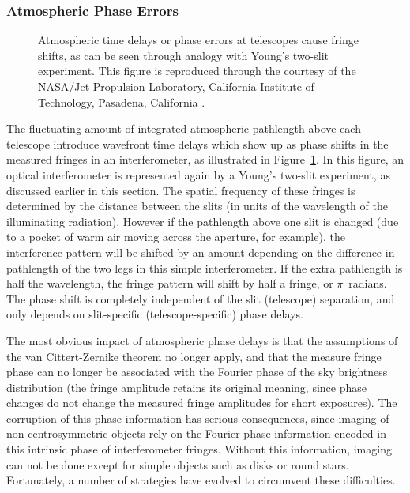 \documentclass[12pt]{iopart}
\begin{document}
\subsubsection{Atmospheric Phase Errors}
\begin{figure}
\begin{center}
\centerline{}
\caption{Atmospheric time delays or phase errors at telescopes 
cause fringe shifts, as can be seen through analogy with Young's
two-slit experiment. This figure is reproduced through the courtesy
of the NASA/Jet Propulsion Laboratory, 
California Institute of Technology, Pasadena, California \citep{monnier_mss}.
\label{monnier_fig_1}}
\end{center}
\end{figure}

The fluctuating amount of integrated atmospheric pathlength above each
telescope introduce wavefront time delays which show up as phase
shifts in the measured fringes in an interferometer, as illustrated in
Figure~\ref{monnier_fig_1}.  In this figure, an optical interferometer
is represented again by a Young's two-slit experiment, as discussed
earlier in this section.  The spatial frequency of these
fringes is determined by the distance between the slits (in units of
the wavelength of the illuminating radiation).  However if the
pathlength above one slit is changed (due to a pocket of warm air
moving across the aperture, for example), the interference pattern
will be shifted by an amount depending on the difference in pathlength
of the two legs in this simple interferometer.  If the extra
pathlength is half the wavelength, the fringe pattern will shift by
half a fringe, or $\pi$~radians.  The phase shift is completely
independent of the slit (telescope) separation, and only depends on
slit-specific (telescope-specific) phase delays.

The most obvious impact of atmospheric phase delays is that the
assumptions of the van Cittert-Zernike theorem no longer apply, and
that the measure fringe phase can no longer be associated with the
Fourier phase of the sky brightness distribution (the fringe amplitude
retains its original meaning, since phase changes do not change the
measured fringe amplitudes for short exposures).  The corruption of
this phase information has serious consequences, since imaging of
non-centrosymmetric objects rely on the Fourier phase information
encoded in this intrinsic phase of interferometer fringes.  Without
this information, imaging can not be done except for simple  objects
such as disks or round stars.  Fortunately, a number of strategies
have evolved to circumvent these difficulties.
\end{document}
